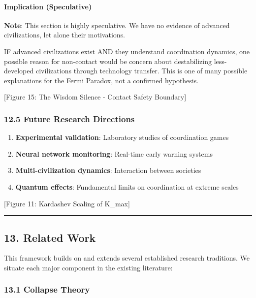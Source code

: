 \documentclass[11pt,letterpaper]{article}
\providecommand{\tightlist}{%
  \setlength{\itemsep}{0pt}\setlength{\parskip}{0pt}}
\begin{document}
\paragraph{Implication (Speculative)}\label{implication-speculative}

\textbf{Note}: This section is highly speculative. We have no evidence
of advanced civilizations, let alone their motivations.

IF advanced civilizations exist AND they understand coordination
dynamics, one possible reason for non-contact would be concern about
destabilizing less-developed civilizations through technology transfer.
This is one of many possible explanations for the Fermi Paradox, not a
confirmed hypothesis.

{[}Figure 15: The Wisdom Silence - Contact Safety Boundary{]}

\subsubsection{12.5 Future Research
Directions}\label{future-research-directions}

\begin{enumerate}
\def\labelenumi{\arabic{enumi}.}
\tightlist
\item
  \textbf{Experimental validation}: Laboratory studies of coordination
  games
\item
  \textbf{Neural network monitoring}: Real-time early warning systems
\item
  \textbf{Multi-civilization dynamics}: Interaction between societies
\item
  \textbf{Quantum effects}: Fundamental limits on coordination at
  extreme scales
\end{enumerate}

{[}Figure 11: Kardashev Scaling of K\_max{]}

\begin{center}\rule{0.5\linewidth}{0.5pt}\end{center}

\subsection{13. Related Work}\label{related-work}

This framework builds on and extends several established research
traditions. We situate each major component in the existing literature:

\subsubsection{13.1 Collapse Theory}\label{collapse-theory}
\end{document}
